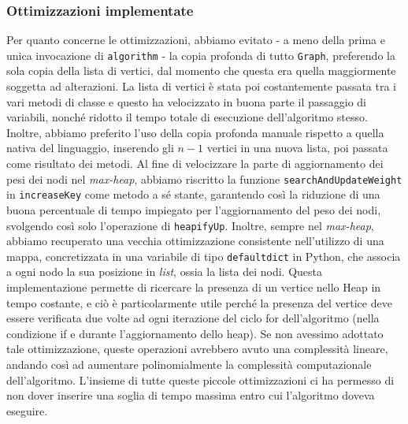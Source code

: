 \subsubsection{Ottimizzazioni implementate}

Per quanto concerne le ottimizzazioni, abbiamo evitato - a meno della prima e unica invocazione di \texttt{algorithm} - la copia profonda di tutto \texttt{Graph}, preferendo la sola copia della lista di vertici, dal momento che questa era quella maggiormente soggetta ad alterazioni. La lista di vertici è stata poi costantemente passata tra i vari metodi di classe e questo ha velocizzato in buona parte il passaggio di variabili, nonché ridotto il tempo totale di esecuzione dell'algoritmo stesso. Inoltre, abbiamo preferito l'uso della copia profonda manuale rispetto a quella nativa del linguaggio, inserendo gli \(n-1\) vertici in una nuova lista, poi passata come risultato dei metodi. 
Al fine di velocizzare la parte di aggiornamento dei pesi dei nodi nel \textit{max-heap}, abbiamo riscritto la funzione \texttt{searchAndUpdateWeight} in \texttt{increaseKey} come metodo a sé stante, garantendo così la riduzione di una buona percentuale di tempo impiegato per l'aggiornamento del peso dei nodi, svolgendo così solo l'operazione di \texttt{heapifyUp}. Inoltre, sempre nel \textit{max-heap}, abbiamo recuperato una vecchia ottimizzazione consistente nell'utilizzo di una mappa, concretizzata in una variabile di tipo \texttt{defaultdict} in Python, che associa a ogni nodo la sua posizione in \textit{list}, ossia la lista dei nodi. Questa implementazione permette di ricercare la presenza di un vertice nello Heap in tempo costante, e ciò è particolarmente utile perché la presenza del vertice deve essere verificata due volte ad ogni iterazione del ciclo for dell'algoritmo (nella condizione if e durante l'aggiornamento dello heap). Se non avessimo adottato tale ottimizzazione, queste operazioni avrebbero avuto una complessità lineare, andando così ad aumentare polinomialmente la complessità computazionale dell'algoritmo.
L'insieme di tutte queste piccole ottimizzazioni ci ha permesso di non dover inserire una soglia di tempo massima entro cui l'algoritmo doveva eseguire.